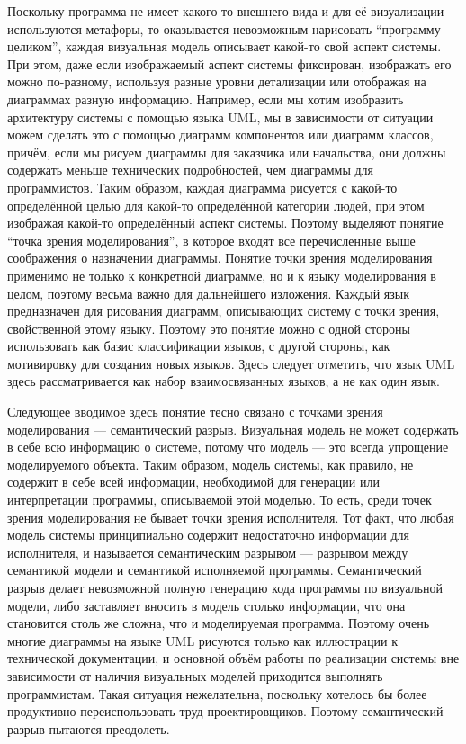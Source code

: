 Поскольку программа не имеет какого-то внешнего вида и для её визуализации 
используются метафоры, то оказывается невозможным нарисовать 
"`программу целиком"', каждая визуальная модель описывает какой-то свой аспект 
системы. При этом, даже если изображаемый аспект системы фиксирован, изображать 
его можно по-разному, используя разные уровни детализации или отображая на 
диаграммах разную информацию. Например, если мы хотим изобразить архитектуру 
системы с помощью языка UML, мы в зависимости от ситуации можем сделать это с 
помощью диаграмм компонентов или диаграмм классов, причём, если мы рисуем 
диаграммы для заказчика или начальства, они должны содержать меньше технических 
подробностей, чем диаграммы для программистов. Таким образом, каждая диаграмма 
рисуется с какой-то определённой целью для какой-то определённой категории 
людей, при этом изображая какой-то определённый аспект системы. Поэтому выделяют 
понятие "`точка зрения моделирования"', в которое входят все перечисленные выше 
соображения о назначении диаграммы. Понятие точки зрения моделирования применимо 
не только к конкретной диаграмме, но и к языку моделирования в целом, поэтому 
весьма важно для дальнейшего изложения. Каждый язык предназначен для рисования 
диаграмм, описывающих систему с точки зрения, свойственной этому языку. 
Поэтому это понятие можно с одной стороны использовать как базис классификации 
языков, с другой стороны, как мотивировку для создания новых языков. Здесь 
следует отметить, что язык UML здесь рассматривается как набор взаимосвязанных 
языков, а не как один язык.

Следующее вводимое здесь понятие тесно связано с точками зрения моделирования 
--- семантический разрыв. Визуальная модель не может содержать в себе всю 
информацию о системе, потому что модель --- это всегда упрощение моделируемого 
объекта. Таким образом, модель системы, как правило, не содержит в себе всей 
информации, необходимой для генерации или интерпретации программы, описываемой 
этой моделью. То есть, среди точек зрения моделирования не бывает точки зрения 
исполнителя. Тот факт, что любая модель системы принципиально содержит 
недостаточно информации для исполнителя, и называется семантическим разрывом ---
разрывом между семантикой модели и семантикой исполняемой программы. 
Семантический разрыв делает невозможной полную генерацию кода программы по 
визуальной модели, либо заставляет вносить в модель столько информации, что 
она становится столь же сложна, что и моделируемая программа. Поэтому очень 
многие диаграммы на языке UML рисуются только как иллюстрации к технической 
документации, и основной объём работы по реализации системы вне зависимости от 
наличия визуальных моделей приходится выполнять программистам. Такая ситуация 
нежелательна, поскольку хотелось бы более продуктивно переиспользовать труд 
проектировщиков. Поэтому семантический разрыв пытаются преодолеть.

